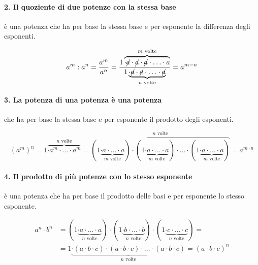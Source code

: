 \vspace{-1.5em}
\paragraph{2. Il quoziente di due potenze con la stessa base} 
è una potenza che ha per base la stessa base e per esponente la differenza 
degli esponenti.

\[
a^m: a^n = \frac{a^m}{a^n}=
\frac{1 \overbrace{\cdot \cancel{a} \cdot \cancel{a} \cdot \cancel{a} \cdot 
                \ldots \cdot a}^{m \text{ volte}}}
{1 \underbrace{\cdot \cancel{a} \cdot \cancel{a} \cdot
                \ldots \cdot \cancel{a}}_{n \text{ volte}}}=
a^{m-n}
\]

\vspace{-1.5em}
\paragraph{3. La potenza di una potenza è una potenza} 
che ha per base la stessa base e per esponente il prodotto degli esponenti.

\[(a^m)^n =
1 \overbrace{\cdot a^m\cdot \ldots\cdot a^m}^{n\text{ volte}}%
 =\overbrace{(1 \underbrace{\cdot a\cdot \ldots\cdot a}_{m\text{ 
volte}})\cdot%
   (1 \underbrace{\cdot a\cdot \ldots\cdot a}_{m\text{ 
volte}})\cdot\ldots\cdot%
   (1 \underbrace{\cdot a\cdot \ldots\cdot a}_{m\text{ 
volte}})}^{n\text{ volte}}%
   =a^{m\cdot n}\]

\vspace{-1.5em}
\paragraph{4. Il prodotto di più potenze con lo stesso esponente} 
è una potenza che ha per base il prodotto delle basi e per esponente 
lo stesso esponente.

\begin{align*}
a^n \cdot b^n &=
  (1 \underbrace{\cdot a \cdot \ldots \cdot a}_{n\text{ volte}}) \cdot
  (1 \underbrace{\cdot b \cdot \ldots \cdot b}_{n\text{ volte}}) \cdot
  (1 \underbrace{\cdot c \cdot \ldots \cdot c}_{n\text{ volte}}) =\\
&=
  1 \underbrace{\cdot (a \cdot b \cdot c) \cdot (a \cdot b \cdot c) \cdot
              \ldots \cdot (a \cdot b \cdot c)}_{n\text{ volte}}=
   (a \cdot b \cdot c)^n
\end{align*}


